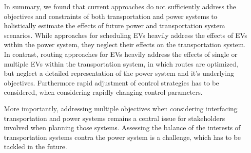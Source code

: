 In summary, we found that current approaches do not sufficiently address the objectives and constraints of both transportation and power systems to holistically estimate the effects of future power and transportation system scenarios. While approaches for scheduling EVs heavily address the effects of EVs within the power system, they neglect their effects on the transportation system. In contrast, routing approaches for EVs heavily address the effects of single or multiple EVs within the transportation system, in which routes are optimized, but neglect a detailed representation of the power system and it's underlying objectives. Furthermore rapid adjustment of control strategies has to be considered, when considering rapidly changing control parameters.

More importantly, addressing multiple objectives when considering interfacing transportation and power systems remains a central issue for stakeholders involved when planning those systems. 
Assessing the balance of the interests of transportation systems contra the power system is a challenge, which has to be tackled in the future.

